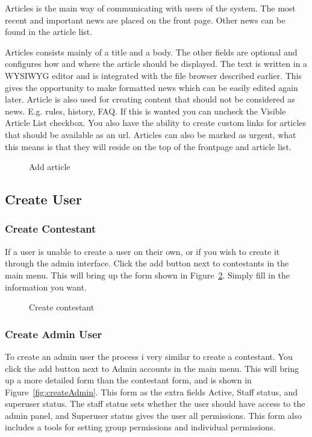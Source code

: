 Articles is the main way of communicating with users of the system. The
most recent and important news are placed on the front page. Other news
can be found in the article list.

Articles consists mainly of a title and a body. The other fields are
optional and configures how and where the article should be displayed.
The text is written in a WYSIWYG editor and is integrated with the file
browser described earlier. This gives the opportunity to make formatted
news which can be easily edited again later. Article is also used for
creating content that should not be considered as news. E.g. rules,
history, FAQ. If this is wanted you can uncheck the Visible Article
List checkbox. You also have the ability to create custom links for
articles that should be available as an url. Articles can also be
marked as urgent, what this means is that they will reside on the top
of the frontpage and article list.

\begin{figure}
\centering
	\caption{Add article}
	\label{fig:article}
\end{figure}

\subsection{Create User}

\subsubsection{Create Contestant}

If a user is unable to create a user on their own, or if you wish to
create it through the admin interface. Click the add button next to
contestants in the main menu. This will bring up the form shown in
Figure~\ref{fig:createContestant}. Simply fill in the information you want.

\begin{figure}
\centering
	\caption{Create contestant}
	\label{fig:createContestant}
\end{figure}


\subsubsection{Create Admin User}

To create an admin user the process i very similar to create a
contestant. You click the add button next to Admin accounts in the main
menu. This will bring up a more detailed form than the contestant form,
and is shown in Figure~\ref{fig:createAdmin}. This form as the extra fields Active,
Staff status, and superuser status. The staff status sets whether the
user should have access to the admin panel, and Superuser status gives
the user all permissions. This form also includes a tools for setting
group permissions and individual permissions. 

